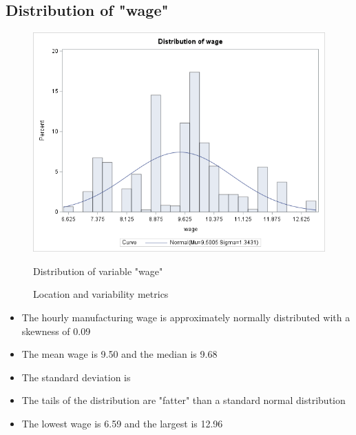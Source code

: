 \documentclass[12pt]{article}
\begin{document}
\subsection{Distribution of "wage"}
\begin{figure}[h]
    \centering
    \begin{minipage}[t]{0.65\textwidth}
        \vspace{0pt}
        \centering
        \includegraphics[width=\textwidth]{images/wage_hist.png}
        \caption{Distribution of variable "wage"}
        \label{fig:wage_dist}
    \end{minipage}\hfill
    \begin{minipage}[t]{0.3\textwidth}
        \vspace{15pt}
        \centering
        
        \caption{Location and variability metrics}
        \label{fig:wage_measures}
    \end{minipage}
    \label{fig:wage_fig}
\end{figure}
\newpage
\begin{itemize}
    \item The hourly manufacturing wage is approximately normally distributed with a skewness of 0.09
    \item The mean wage is 9.50 and the median is 9.68
    \item The standard deviation is 
    \item The tails of the distribution are "fatter" than a standard normal distribution
    \item The lowest wage is 6.59 and the largest is 12.96
\end{itemize}
\end{document}
